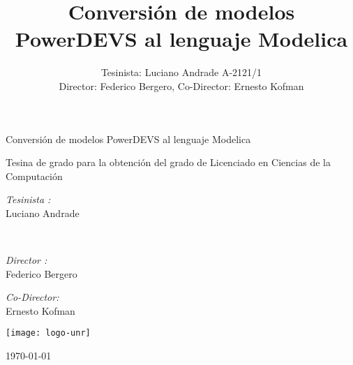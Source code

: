 \documentclass[a4paper,	11pt]{report}
\begin{document}
\renewcommand\floatpagefraction{.9}
\renewcommand\topfraction{.9}
\renewcommand\bottomfraction{.9}
\renewcommand\textfraction{.1}
\setcounter{totalnumber}{50}
\setcounter{topnumber}{50}
\setcounter{bottomnumber}{50}
\newcommand{\quotes}[1]{``#1''}

\title{Conversión de modelos PowerDEVS al lenguaje Modelica}
\author{Tesinista: Luciano Andrade A-2121/1\\ Director: Federico Bergero, Co-Director: Ernesto Kofman} 


\begin{titlepage}
\begin{center}

\huge Conversión de modelos PowerDEVS al lenguaje Modelica

\vfill

Tesina de grado para la obtención del grado de Licenciado en Ciencias de la Computación

\begin{minipage}[t]{0.4\textwidth}
\begin{flushleft} \large
\emph{Tesinista :}\\
Luciano Andrade
\end{flushleft}
\end{minipage}\\ 
\vfill
\begin{minipage}[t]{0.4\textwidth}
\begin{flushleft} \large
\emph{Director :}\\
Federico Bergero
\end{flushleft}
\end{minipage}%
\begin{minipage}[t]{0.4\textwidth}
\begin{flushright} \large
\emph{Co-Director:} \\
Ernesto Kofman 
\end{flushright}
\end{minipage}

\vfill

\texttt{[image: logo-unr]}

\vfill

{\large \today}
\end{center}
\end{titlepage}


\tableofcontents
\clearpage
{}
\end{document}
